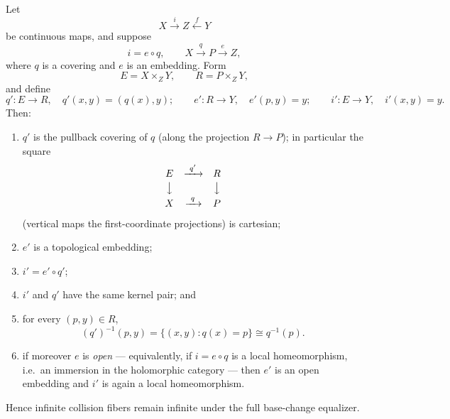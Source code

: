 \begin{proposition}\label{prop:base-change}
Let
\[
X\xrightarrow{\ i\ }Z\xleftarrow{\ f\ }Y
\]
be continuous maps, and suppose
\[
i=e\circ q,\qquad X\xrightarrow{\ q\ }P\xrightarrow{\ e\ }Z,
\]
where \(q\) is a covering and \(e\) is an embedding.  Form
\[
E=X\times_ZY,\qquad R=P\times_ZY,
\]
and define
\begin{equation}\label{eq:base-change-maps}
q'\colon E\to R,\quad q'(x,y)=(q(x),y);
\qquad
e'\colon R\to Y,\quad e'(p,y)=y;
\qquad
i'\colon E\to Y,\quad i'(x,y)=y.
\end{equation}
Then:
\begin{enumerate}
\item \(q'\) is the pullback covering of \(q\) (along the projection \(R\to P\)); in particular the square
\[
\begin{array}{ccc}
E&\xrightarrow{\ q'\ }&R\\[2pt]
\big\downarrow&&\big\downarrow\\[2pt]
X&\xrightarrow{\ q\ }&P
\end{array}
\]
(vertical maps the first-coordinate projections) is cartesian;
\item \(e'\) is a topological embedding;
\item \(i'=e'\circ q'\);
\item \(i'\) and \(q'\) have the same kernel pair; and
\item for every \((p,y)\in R\),
\begin{equation}\label{eq:fiber-bijection}
(q')^{-1}(p,y)=\{(x,y):q(x)=p\}\cong q^{-1}(p).
\end{equation}
\item if moreover \(e\) is \emph{open} --- equivalently, if \(i=e\circ q\) is a local homeomorphism, i.e.\ an immersion in the holomorphic category --- then \(e'\) is an open embedding and \(i'\) is again a local homeomorphism.
\end{enumerate}
Hence infinite collision fibers remain infinite under the full base-change equalizer.
\end{proposition}

